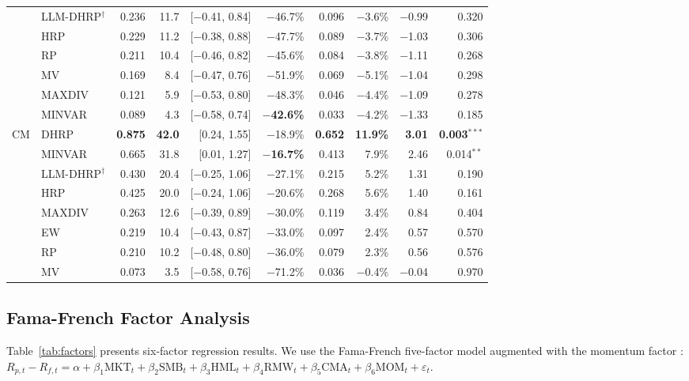 \documentclass{article}
\begin{document}
\begin{table}[t]
{\begin{tabular}{ll rrrrrrrr}
& LLM-DHRP$^{\dagger}$ & 0.236 & 11.7 & [$-$0.41, 0.84] & $-$46.7\% & 0.096 & $-$3.6\% & $-$0.99 & 0.320 \\
& HRP & 0.229 & 11.2 & [$-$0.38, 0.88] & $-$47.7\% & 0.089 & $-$3.7\% & $-$1.03 & 0.306 \\
& RP & 0.211 & 10.4 & [$-$0.46, 0.82] & $-$45.6\% & 0.084 & $-$3.8\% & $-$1.11 & 0.268 \\
& MV & 0.169 & 8.4 & [$-$0.47, 0.76] & $-$51.9\% & 0.069 & $-$5.1\% & $-$1.04 & 0.298 \\
& MAXDIV & 0.121 & 5.9 & [$-$0.53, 0.80] & $-$48.3\% & 0.046 & $-$4.4\% & $-$1.09 & 0.278 \\
& MINVAR & 0.089 & 4.3 & [$-$0.58, 0.74] & \textbf{$-$42.6\%} & 0.033 & $-$4.2\% & $-$1.33 & 0.185 \\
\midrule
\multirow{8}{*}{CM}
& DHRP & \textbf{0.875} & \textbf{42.0} & [0.24, 1.55] & $-$18.9\% & \textbf{0.652} & \textbf{11.9\%} & \textbf{3.01} & \textbf{0.003}$^{***}$ \\
& MINVAR & 0.665 & 31.8 & [0.01, 1.27] & \textbf{$-$16.7\%} & 0.413 & 7.9\% & 2.46 & 0.014$^{**}$ \\
& LLM-DHRP$^{\dagger}$ & 0.430 & 20.4 & [$-$0.25, 1.06] & $-$27.1\% & 0.215 & 5.2\% & 1.31 & 0.190 \\
& HRP & 0.425 & 20.0 & [$-$0.24, 1.06] & $-$20.6\% & 0.268 & 5.6\% & 1.40 & 0.161 \\
& MAXDIV & 0.263 & 12.6 & [$-$0.39, 0.89] & $-$30.0\% & 0.119 & 3.4\% & 0.84 & 0.404 \\
& EW & 0.219 & 10.4 & [$-$0.43, 0.87] & $-$33.0\% & 0.097 & 2.4\% & 0.57 & 0.570 \\
& RP & 0.210 & 10.2 & [$-$0.48, 0.80] & $-$36.0\% & 0.079 & 2.3\% & 0.56 & 0.576 \\
& MV & 0.073 & 3.5 & [$-$0.58, 0.76] & $-$71.2\% & 0.036 & $-$0.4\% & $-$0.04 & 0.970 \\
\bottomrule
\end{tabular}
}
\end{table}

\subsection{Fama-French Factor Analysis}

Table~\ref{tab:factors} presents six-factor regression results. We use the Fama-French five-factor model \citep{FamaFrench2015} augmented with the momentum factor \citep{Carhart1997}: $R_{p,t} - R_{f,t} = \alpha + \beta_1 \text{MKT}_t + \beta_2 \text{SMB}_t + \beta_3 \text{HML}_t + \beta_4 \text{RMW}_t + \beta_5 \text{CMA}_t + \beta_6 \text{MOM}_t + \varepsilon_t$.
\end{document}
